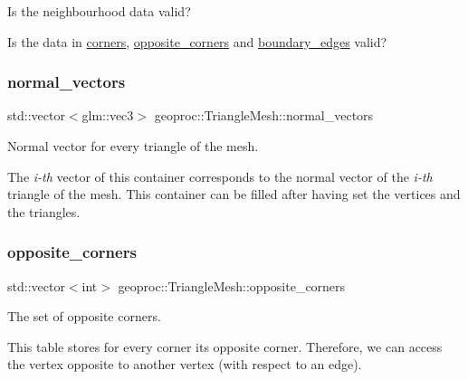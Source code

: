 Is the neighbourhood data valid? 

Is the data in \hyperlink{classgeoproc_1_1TriangleMesh_ab9610d614e081deb28010d237fecd55b}{corners}, \hyperlink{classgeoproc_1_1TriangleMesh_a2604795c90c694116513252b86d242b4}{opposite\+\_\+corners} and \hyperlink{classgeoproc_1_1TriangleMesh_a142a764ddf07b98c7efcd596d88c3f87}{boundary\+\_\+edges} valid? \mbox{\label{classgeoproc_1_1TriangleMesh_ab9030a0301b2fe5868ad6c08692cce09}} 
\subsubsection{\texorpdfstring{normal\+\_\+vectors}{normal\_vectors}}
{\footnotesize\ttfamily std\+::vector$<$glm\+::vec3$>$ geoproc\+::\+Triangle\+Mesh\+::normal\+\_\+vectors\hspace{0.3cm}{\ttfamily [protected]}}



Normal vector for every triangle of the mesh. 

The {\itshape i-\/th} vector of this container corresponds to the normal vector of the {\itshape i-\/th} triangle of the mesh. This container can be filled after having set the vertices and the triangles. \mbox{\label{classgeoproc_1_1TriangleMesh_a2604795c90c694116513252b86d242b4}} 
\subsubsection{\texorpdfstring{opposite\+\_\+corners}{opposite\_corners}}
{\footnotesize\ttfamily std\+::vector$<$int$>$ geoproc\+::\+Triangle\+Mesh\+::opposite\+\_\+corners\hspace{0.3cm}{\ttfamily [protected]}}



The set of opposite corners. 

This table stores for every corner its opposite corner. Therefore, we can access the vertex opposite to another vertex (with respect to an edge).

